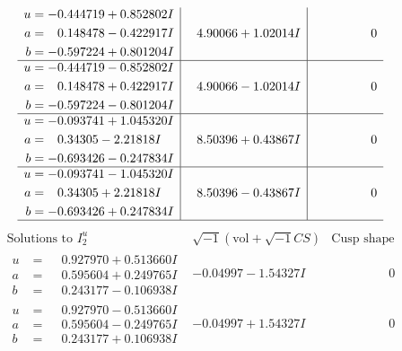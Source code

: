 \documentclass[1p]{elsarticle_modified}
\theoremstyle{definition}
\newcommand{\I}{\sqrt{-1}}
\begin{document}
$$\begin{array}{c|c|c}
\begin{aligned}
u &= -0.444719 + 0.852802 I \\
a &= \phantom{-}0.148478 - 0.422917 I \\
b &= -0.597224 + 0.801204 I\end{aligned}
 & \phantom{-}4.90066 + 1.02014 I & \phantom{-0.000000 } 0 \\ \hline\begin{aligned}
u &= -0.444719 - 0.852802 I \\
a &= \phantom{-}0.148478 + 0.422917 I \\
b &= -0.597224 - 0.801204 I\end{aligned}
 & \phantom{-}4.90066 - 1.02014 I & \phantom{-0.000000 } 0 \\ \hline\begin{aligned}
u &= -0.093741 + 1.045320 I \\
a &= \phantom{-}0.34305 - 2.21818 I \\
b &= -0.693426 - 0.247834 I\end{aligned}
 & \phantom{-}8.50396 + 0.43867 I & \phantom{-0.000000 } 0 \\ \hline\begin{aligned}
u &= -0.093741 - 1.045320 I \\
a &= \phantom{-}0.34305 + 2.21818 I \\
b &= -0.693426 + 0.247834 I\end{aligned}
 & \phantom{-}8.50396 - 0.43867 I & \phantom{-0.000000 } 0\\
 \hline 
 \end{array}$$\newpage$$\begin{array}{c|c|c}  
\text{Solutions to }I^u_{2}& \I (\text{vol} + \sqrt{-1}CS) & \text{Cusp shape}\\
 \hline 
\begin{aligned}
u &= \phantom{-}0.927970 + 0.513660 I \\
a &= \phantom{-}0.595604 + 0.249765 I \\
b &= \phantom{-}0.243177 - 0.106938 I\end{aligned}
 & -0.04997 - 1.54327 I & \phantom{-0.000000 } 0 \\ \hline\begin{aligned}
u &= \phantom{-}0.927970 - 0.513660 I \\
a &= \phantom{-}0.595604 - 0.249765 I \\
b &= \phantom{-}0.243177 + 0.106938 I\end{aligned}
 & -0.04997 + 1.54327 I & \phantom{-0.000000 } 0 \\ \hline\begin{aligned}

\end{aligned}
\end{array}$$
\end{document}
